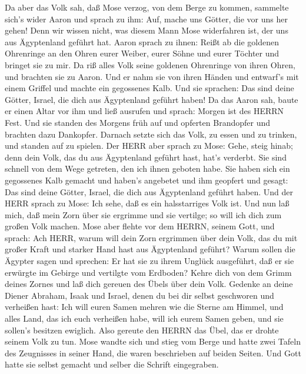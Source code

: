  Da aber das Volk sah, daß Mose verzog, von dem Berge zu
kommen, sammelte sich's wider Aaron und sprach zu ihm: Auf, mache uns
Götter, die vor uns her gehen! Denn wir wissen nicht, was diesem Mann
Mose widerfahren ist, der uns aus Ägyptenland geführt hat. 
Aaron sprach zu ihnen: Reißt ab die goldenen Ohrenringe an den Ohren
eurer Weiber, eurer Söhne und eurer Töchter und bringet sie zu mir.
 Da riß alles Volk seine goldenen Ohrenringe von ihren
Ohren, und brachten sie zu Aaron.  Und er nahm sie von ihren
Händen und entwarf's mit einem Griffel und machte ein gegossenes Kalb.
Und sie sprachen: Das sind deine Götter, Israel, die dich aus
Ägyptenland geführt haben!  Da das Aaron sah, baute er einen
Altar vor ihm und ließ ausrufen und sprach: Morgen ist des HERRN Fest.
 Und sie standen des Morgens früh auf und opferten
Brandopfer und brachten dazu Dankopfer. Darnach setzte sich das Volk, zu
essen und zu trinken, und standen auf zu spielen.  Der HERR
aber sprach zu Mose: Gehe, steig hinab; denn dein Volk, das du aus
Ägyptenland geführt hast, hat's verderbt.  Sie sind schnell
von dem Wege getreten, den ich ihnen geboten habe. Sie haben sich ein
gegossenes Kalb gemacht und haben's angebetet und ihm geopfert und
gesagt: Das sind deine Götter, Israel, die dich aus Ägyptenland geführt
haben.  Und der HERR sprach zu Mose: Ich sehe, daß es ein
halsstarriges Volk ist.  Und nun laß mich, daß mein Zorn
über sie ergrimme und sie vertilge; so will ich dich zum großen Volk
machen.  Mose aber flehte vor dem HERRN, seinem Gott, und
sprach: Ach HERR, warum will dein Zorn ergrimmen über dein Volk, das du
mit großer Kraft und starker Hand hast aus Ägyptenland geführt?
 Warum sollen die Ägypter sagen und sprechen: Er hat sie zu
ihrem Unglück ausgeführt, daß er sie erwürgte im Gebirge und vertilgte
vom Erdboden? Kehre dich von dem Grimm deines Zornes und laß dich
gereuen des Übels über dein Volk.  Gedenke an deine Diener
Abraham, Isaak und Israel, denen du bei dir selbst geschworen und
verheißen hast: Ich will euren Samen mehren wie die Sterne am Himmel,
und alles Land, das ich euch verheißen habe, will ich eurem Samen geben,
und sie sollen's besitzen ewiglich.  Also gereute den HERRN
das Übel, das er drohte seinem Volk zu tun.  Mose wandte
sich und stieg vom Berge und hatte zwei Tafeln des Zeugnisses in seiner
Hand, die waren beschrieben auf beiden Seiten.  Und Gott
hatte sie selbst gemacht und selber die Schrift eingegraben.
